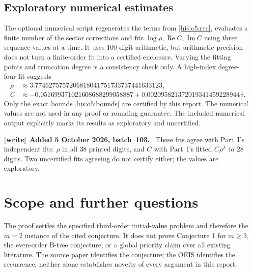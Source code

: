 \documentclass[11pt]{article}
\theoremstyle{remark}\newtheorem{remark}[theorem]{Remark}
\DeclareMathOperator{\Rea}{Re}
\DeclareMathOperator{\Ima}{Im}
\newcommand{\la}{\lambda}
\numberwithin{equation}{section}
\newenvironment{writenote}[1][]{\par\smallskip\begingroup\small
 \noindent\textbf{[write]}\if\relax\detokenize{#1}\relax\else~\textbf{#1.}\fi\ }%
 {\par\endgroup\smallskip}
\begin{document}
\subsection{Exploratory numerical estimates}
The optional numerical script regenerates the terms from
\eqref{his:o5:rec}, evaluates a finite number of the sector corrections and fits
$\log\rho,\Rea C,\Ima C$ using three sequence values at a time.
It uses 100-digit arithmetic, but arithmetic precision does not turn a
finite-order fit into a certified enclosure. Varying the fitting points
and truncation degree is a consistency check only.
A high-index degree-four fit suggests
\begin{align*}
\rho&\approx3.7746275757206818041751733737441633123,\\
C&\approx-0.051699371021608688299058887
       +0.002095821372019341459228944\,i.
\end{align*}
Only the exact bounds \eqref{his:o5:bounds} are certified by this report.
The numerical values are not used in any proof or rounding guarantee.
The included numerical output explicitly marks its results as exploratory
and uncertified.
\begin{writenote}[Added 5 October 2026, batch~103]
These fits agree with Part~I's independent fits: $\rho$ in all 38 printed digits, and $C$ with Part~I's fitted $C\rho^\la$ to 28 digits. Two uncertified fits agreeing do not certify either; the values are exploratory.
\end{writenote}


\section{Scope and further questions}\label{his:o5:sec:scope}
The proof settles the specified third-order initial-value problem and
therefore the $m=2$ instance of the cited conjecture. It does not prove
Conjecture 1 for $m\ge3$, the even-order B-tree conjecture, or a global
priority claim over all existing literature. The source paper identifies
the conjecture; the OEIS identifies the recurrence; neither alone
establishes novelty of every argument in this report.
\end{document}
